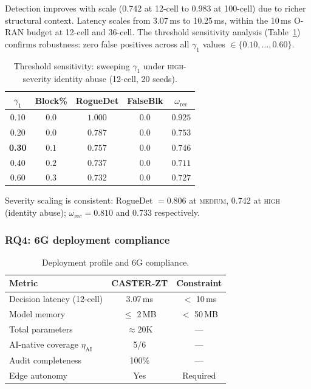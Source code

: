 \documentclass[lettersize,journal]{IEEEtran}
\begin{document}
Detection improves with scale (0.742 at 12-cell to 0.983 at 100-cell) due to richer structural context.
Latency scales from 3.07\,ms to 10.25\,ms, within the 10\,ms O-RAN budget at 12-cell and 36-cell.
The threshold sensitivity analysis (Table~\ref{tab:threshold_sensitivity}) confirms robustness: zero false positives across all $\gamma_1$ values $\in\{0.10,\ldots,0.60\}$.

\begin{table}[t]
\centering
\caption{Threshold sensitivity: sweeping $\gamma_1$ under \textsc{high}-severity identity abuse (12-cell, 20 seeds).}
\label{tab:threshold_sensitivity}
\begin{tabular}{ccccc}
\toprule
$\gamma_1$ & Block\% & RogueDet & FalseBlk & $\omega_{\mathrm{rec}}$ \\
\midrule
0.10 & $0.0$ & $1.000$ & $0.0$ & $0.925$ \\
0.20 & $0.0$ & $0.787$ & $0.0$ & $0.753$ \\
\textbf{0.30} & $\mathbf{0.1}$ & $\mathbf{0.757}$ & $\mathbf{0.0}$ & $\mathbf{0.746}$ \\
0.40 & $0.2$ & $0.737$ & $0.0$ & $0.711$ \\
0.60 & $0.3$ & $0.732$ & $0.0$ & $0.727$ \\
\bottomrule
\end{tabular}
\end{table}

Severity scaling is consistent: RogueDet $=0.806$ at \textsc{medium}, 0.742 at \textsc{high} (identity abuse); $\omega_{\mathrm{rec}}=0.810$ and 0.733 respectively.


\subsubsection{RQ4: 6G deployment compliance}

\begin{table}[t]
\centering
\caption{Deployment profile and 6G compliance.}
\label{tab:deployment}
\begin{tabular}{lcc}
\toprule
Metric & CASTER-ZT & Constraint \\
\midrule
Decision latency (12-cell) & 3.07\,ms & $<$ 10\,ms \\
Model memory & $\le$ 2\,MB & $<$ 50\,MB \\
Total parameters & $\approx$20K & --- \\
AI-native coverage $\eta_{\mathrm{AI}}$ & 5/6 & --- \\
Audit completeness & 100\% & --- \\
Edge autonomy & Yes & Required \\
\bottomrule
\end{tabular}
\end{table}
\end{document}
